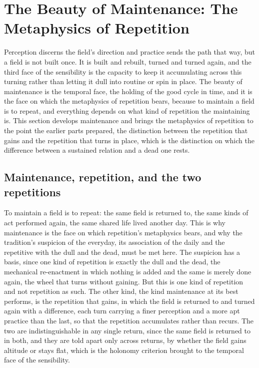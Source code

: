 \section{The Beauty of Maintenance: The Metaphysics of Repetition}
\label{p22:sec:maintenance}

\noindent
Perception discerns the field's direction and practice sends the path that way, but a field is not built once. It is built and rebuilt, turned and turned again, and the third face of the sensibility is the capacity to keep it accumulating across this turning rather than letting it dull into routine or spin in place. The beauty of maintenance is the temporal face, the holding of the good cycle in time, and it is the face on which the metaphysics of repetition bears, because to maintain a field is to repeat, and everything depends on what kind of repetition the maintaining is. This section develops maintenance and brings the metaphysics of repetition to the point the earlier parts prepared, the distinction between the repetition that gains and the repetition that turns in place, which is the distinction on which the difference between a sustained relation and a dead one rests.

\subsection{Maintenance, repetition, and the two repetitions}
\label{p22:sub:maintenance-two}

To maintain a field is to repeat: the same field is returned to, the same kinds of act performed again, the same shared life lived another day. This is why maintenance is the face on which repetition's metaphysics bears, and why the tradition's suspicion of the everyday, its association of the daily and the repetitive with the dull and the dead, must be met here. The suspicion has a basis, since one kind of repetition is exactly the dull and the dead, the mechanical re-enactment in which nothing is added and the same is merely done again, the wheel that turns without gaining. But this is one kind of repetition and not repetition as such. The other kind, the kind maintenance at its best performs, is the repetition that gains, in which the field is returned to and turned again with a difference, each turn carrying a finer perception and a more apt practice than the last, so that the repetition accumulates rather than recurs. The two are indistinguishable in any single return, since the same field is returned to in both, and they are told apart only across returns, by whether the field gains altitude or stays flat, which is the holonomy criterion brought to the temporal face of the sensibility.

